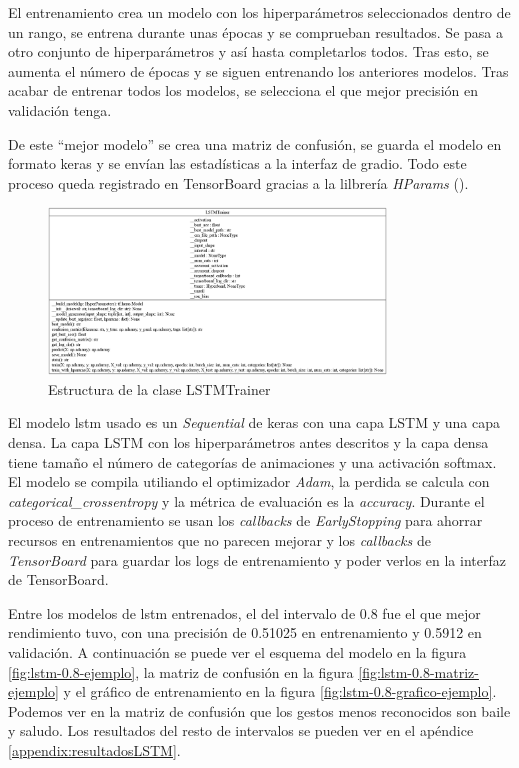 El entrenamiento crea un modelo con los hiperparámetros seleccionados dentro de un rango, se entrena durante unas épocas y se comprueban resultados. Se pasa a otro conjunto de hiperparámetros y así hasta completarlos todos. Tras esto, se aumenta el número de épocas y se siguen entrenando los anteriores modelos. Tras acabar de entrenar todos los modelos, se selecciona el que mejor precisión en validación tenga.

De este ``mejor modelo'' se crea una matriz de confusión, se guarda el modelo en formato keras y se envían las estadísticas a la interfaz de gradio. Todo este proceso queda registrado en TensorBoard gracias a la lilbrería \textit{HParams} (\cite{hparams}).

\begin{figure}[h!]
    \centering
    \includegraphics[width=0.8\textwidth]{Imagenes/Bitmap/classes_LSTMTrainer.png}
    \caption{Estructura de la clase LSTMTrainer}
    \label{fig:lstm-estructura}
\end{figure}

El modelo \gls{lstm} usado es un \textit{Sequential} de keras con una capa LSTM y una capa densa. La capa LSTM con los hiperparámetros antes descritos y la capa densa tiene tamaño el número de categorías de animaciones y una activación softmax. El modelo se compila utiliando el optimizador \textit{Adam}, la perdida se calcula con \textit{categorical\_crossentropy} y la métrica de evaluación es la \textit{accuracy}. Durante el proceso de entrenamiento se usan los \textit{callbacks} de \textit{EarlyStopping} para ahorrar recursos en entrenamientos que no parecen mejorar y los \textit{callbacks} de \textit{TensorBoard} para guardar los logs de entrenamiento y poder verlos en la interfaz de TensorBoard.

Entre los modelos de \gls{lstm} entrenados, el del intervalo de 0.8 fue el que mejor rendimiento tuvo, con una precisión de 0.51025 en entrenamiento y 0.5912 en validación. A continuación se puede ver el esquema del modelo en la figura \ref{fig:lstm-0.8-ejemplo}, la matriz de confusión en la figura \ref{fig:lstm-0.8-matriz-ejemplo} y el gráfico de entrenamiento en la figura \ref{fig:lstm-0.8-grafico-ejemplo}. Podemos ver en la matriz de confusión que los gestos menos reconocidos son baile y saludo. Los resultados del resto de intervalos se pueden ver en el apéndice \ref{appendix:resultadosLSTM}.

